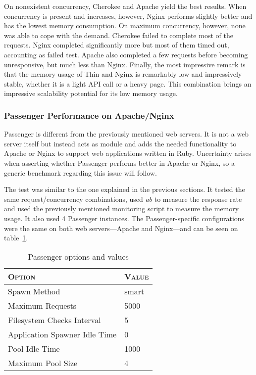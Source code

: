 On nonexistent concurrency, Cherokee and Apache yield the best results. When concurrency is present and increases, however, Nginx performs slightly better and has the lowest memory consumption. On maximum concurrency, however, none was able to cope with the demand. Cherokee failed to complete most of the requests. Nginx completed significantly more but most of them timed out, accounting as failed test. Apache also completed a few requests before becoming unresponsive, but much less than Nginx. Finally, the most impressive remark is that the memory usage of Thin and Nginx is remarkably low and impressively stable, whether it is a light API call or a heavy page. This combination brings an impressive scalability potential for its low memory usage.

\subsubsection{Passenger Performance on Apache/Nginx}
Passenger is different from the previously mentioned web servers. It is not a web server itself but instead acts as module and adds the needed functionality to Apache or Nginx to support web applications written in Ruby. Uncertainty arises when asserting whether Passenger performs better in Apache or Nginx, so a generic benchmark regarding this issue will follow.

The test was similar to the one explained in the previous sections. It tested the same request/concurrency combinations, used \textit{ab} to measure the response rate and used the previously mentioned monitoring script to measure the memory usage. It also used 4 Passenger instances. The Passenger-specific configurations were the same on both web servers---Apache and Nginx---and can be seen on table~\ref{tab:passenger4_configuration}.
\begin{table}[h!t]
  \centering
  \caption{Passenger options and values}
  \label{tab:passenger4_configuration}
  
  \begin{tabular}{p{}|p{}}
  
    \textsc{\textbf{Option}} & \textsc{\textbf{Value}} \\ \hline
    Spawn Method & smart \\ \hline
    Maximum Requests & 5000 \\ \hline
    Filesystem Checks Interval & 5 \\ \hline
    Application Spawner Idle Time & 0 \\ \hline
    Pool Idle Time & 1000 \\ \hline
    Maximum Pool Size & 4 \\
  
  \end{tabular}
\end{table}

